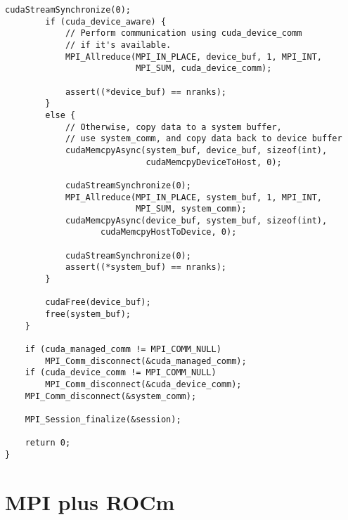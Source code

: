 \begin{example}
\begin{lstlisting}[language={[MPI]C}]
        cudaStreamSynchronize(0);
        if (cuda_device_aware) {
            // Perform communication using cuda_device_comm
            // if it's available.
            MPI_Allreduce(MPI_IN_PLACE, device_buf, 1, MPI_INT,
                          MPI_SUM, cuda_device_comm);

            assert((*device_buf) == nranks);
        }
        else {
            // Otherwise, copy data to a system buffer,
            // use system_comm, and copy data back to device buffer
            cudaMemcpyAsync(system_buf, device_buf, sizeof(int),
                            cudaMemcpyDeviceToHost, 0);

            cudaStreamSynchronize(0);
            MPI_Allreduce(MPI_IN_PLACE, system_buf, 1, MPI_INT,
                          MPI_SUM, system_comm);
            cudaMemcpyAsync(device_buf, system_buf, sizeof(int),
                   cudaMemcpyHostToDevice, 0);

            cudaStreamSynchronize(0);
            assert((*system_buf) == nranks);
        }

        cudaFree(device_buf);
        free(system_buf);
    }

    if (cuda_managed_comm != MPI_COMM_NULL)
        MPI_Comm_disconnect(&cuda_managed_comm);
    if (cuda_device_comm != MPI_COMM_NULL)
        MPI_Comm_disconnect(&cuda_device_comm);
    MPI_Comm_disconnect(&system_comm);

    MPI_Session_finalize(&session);

    return 0;
}
\end{lstlisting}
\end{example}

\section{MPI plus ROCm}

